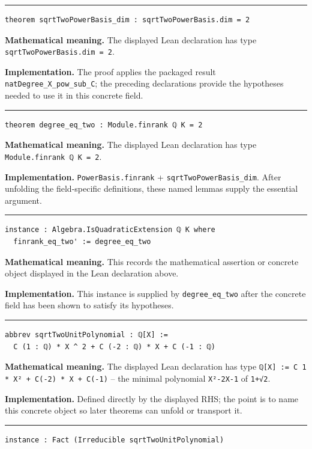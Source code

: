 \documentclass[UTF8,a4paper,11pt,fontset=fandol]{ctexart}
\theoremstyle{definition}
\newcommand{\statementsep}{\par\medskip\hrule\medskip}
\begin{document}
\statementsep
\begin{verbatim}
theorem sqrtTwoPowerBasis_dim : sqrtTwoPowerBasis.dim = 2
\end{verbatim}
\noindent\textbf{Mathematical meaning.} The displayed Lean declaration has type \texttt{sqrtTwoPowerBasis.\allowbreak{}dim = 2}.\par
\noindent\textbf{Implementation.} The proof applies the packaged result \texttt{natDegree\_\allowbreak{}X\_\allowbreak{}pow\_\allowbreak{}sub\_\allowbreak{}C}; the preceding declarations provide the hypotheses needed to use it in this concrete field.\par
\statementsep
\begin{verbatim}
theorem degree_eq_two : Module.finrank ℚ K = 2
\end{verbatim}
\noindent\textbf{Mathematical meaning.} The displayed Lean declaration has type \texttt{Module.\allowbreak{}finrank ℚ K = 2}.\par
\noindent\textbf{Implementation.} \texttt{PowerBasis.\allowbreak{}finrank} + \texttt{sqrtTwoPowerBasis\_\allowbreak{}dim}. After unfolding the field-specific definitions, these named lemmas supply the essential argument.\par
\statementsep
\begin{verbatim}
instance : Algebra.IsQuadraticExtension ℚ K where
  finrank_eq_two' := degree_eq_two
\end{verbatim}
\noindent\textbf{Mathematical meaning.} This records the mathematical assertion or concrete object displayed in the Lean declaration above.\par
\noindent\textbf{Implementation.} This instance is supplied by \texttt{degree\_\allowbreak{}eq\_\allowbreak{}two} after the concrete field has been shown to satisfy its hypotheses.\par
\statementsep
\begin{verbatim}
abbrev sqrtTwoUnitPolynomial : ℚ[X] :=
  C (1 : ℚ) * X ^ 2 + C (-2 : ℚ) * X + C (-1 : ℚ)
\end{verbatim}
\noindent\textbf{Mathematical meaning.} The displayed Lean declaration has type \texttt{ℚ[X] := C 1 * X² + C(-2) * X + C(-1)} -- the minimal polynomial \texttt{X²-2X-1} of \texttt{1+√2}.\par
\noindent\textbf{Implementation.} Defined directly by the displayed RHS; the point is to name this concrete object so later theorems can unfold or transport it.\par
\statementsep
\begin{verbatim}
instance : Fact (Irreducible sqrtTwoUnitPolynomial)
\end{verbatim}
\end{document}
